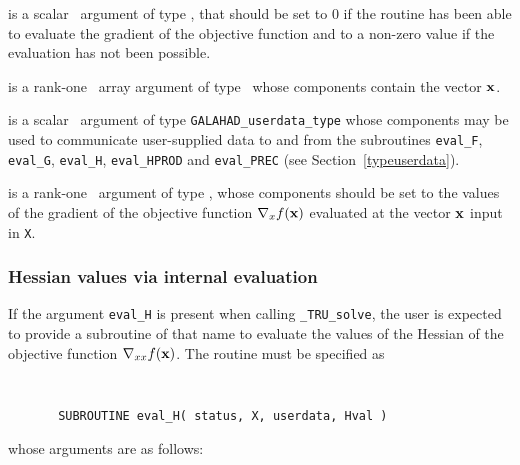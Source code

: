 \documentclass{galahad}
\newcommand{\packagename}{TRU}
\newcommand{\fullpackagename}{\libraryname\_\packagename}
\newcommand{\solver}{{\tt \fullpackagename\_solve}}
\begin{document}
\begin{description}
 is a scalar \intentout\ argument of type \integer,
that should be set to 0 if the routine has been able to evaluate
the gradient of the objective function
and to a non-zero value if the evaluation has not been possible.

 is a rank-one \intentin\ array argument of type \realdp\
whose components contain the vector ${\mathbf{x}}$.

 is a scalar \intentinout\ argument of type
{\tt GALAHAD\_userdata\_type} whose components may be used
to communicate user-supplied data to and from the
subroutines {\tt eval\_F}, {\tt eval\_G},
{\tt eval\_H}, {\tt eval\_HPROD} and {\tt eval\_PREC}
(see Section~\ref{typeuserdata}).

 is a rank-one \intentout\ argument of type \realdp,
whose components should be set to the values of the gradient
of the objective function $\nabla_x f({\mathbf{x}})$
evaluated at the vector ${\mathbf{x}}$ input in {\tt X}.

\end{description}


\subsubsection{Hessian values via internal evaluation\label{hfv}}

If the argument {\tt eval\_H} is present when calling \solver, the
user is expected to provide a subroutine of that name to evaluate the
values of the Hessian of the objective function $\nabla_{xx} f({\mathbf{x}})$.
The routine must be specified as

\def\baselinestretch{0.8}
{\tt
\begin{verbatim}
       SUBROUTINE eval_H( status, X, userdata, Hval )
\end{verbatim} }
\def\baselinestretch{1.0}
\noindent whose arguments are as follows:
\end{document}
